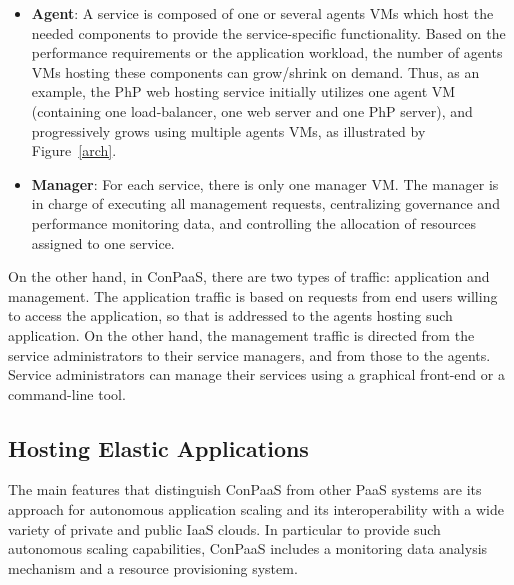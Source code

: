 \begin{itemize}
\item \textbf{Agent}: A service is composed of one or several agents VMs which host the needed components to provide the service-specific functionality. Based on the performance requirements or the application workload, the number of agents VMs hosting these components can grow/shrink on demand. Thus, as an example, the PhP web hosting service initially utilizes one agent VM (containing one load-balancer, one web server and one PhP server), and progressively grows using multiple agents VMs, as illustrated by Figure~\ref{arch}. 

\item \textbf{Manager}: For each service, there is only one manager VM. The manager is in charge of executing all management requests, centralizing governance and performance monitoring data, and controlling the allocation of resources assigned to one service. 

\end{itemize}

On the other hand, in ConPaaS, there are two types of traffic: application and management. The application traffic is based on requests from end users willing to access the application, so that is addressed to the agents hosting such application.  On the other hand, the management traffic is directed from the service administrators to their service managers, and from those to the agents.  Service administrators can manage their services using a graphical front-end or a command-line tool.  

\subsection*{Hosting Elastic Applications}

The main features that distinguish ConPaaS from other PaaS systems are its approach for autonomous application scaling and its interoperability with a wide variety of private and public IaaS clouds. In particular to provide such autonomous scaling capabilities, ConPaaS includes a monitoring data analysis mechanism  and a resource provisioning system.

